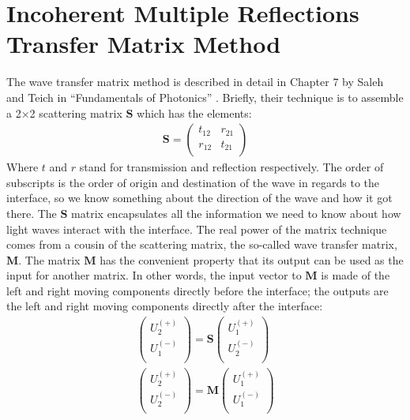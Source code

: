 \documentclass[osajnl,preprint,showpacs,superscriptaddress,12pt]{revtex4-1} %
\begin{document}
\appendix

\section{Incoherent Multiple Reflections Transfer Matrix Method}
\label{sec:Append-IMRTMM}

The wave transfer matrix method is described in detail in Chapter 7 by Saleh and Teich in ``Fundamentals of Photonics'' \cite{2007fuph.book.....S}.  Briefly, their technique is to assemble a 2$\times$2 scattering matrix $\boldsymbol{S}$ which has the elements:
\begin{eqnarray}
\boldsymbol{S} = \left(
\begin{array}{cc}
 t_{12} & r_{21} \\
 r_{12} & t_{21} \\
\end{array}
\right)
\end{eqnarray}
Where $t$ and $r$ stand for transmission and reflection respectively.  The order of subscripts is the order of origin and destination of the wave in regards to the interface, so we know something about the direction of the wave and how it got there.  The $\boldsymbol{S}$ matrix encapsulates all the information we need to know about how light waves interact with the interface.  The real power of the matrix technique comes from a cousin of the scattering matrix, the so-called wave transfer matrix, $\boldsymbol{M}$.  The matrix $\boldsymbol{M}$ has the convenient property that its output can be used as the input for another matrix.  In other words, the input vector to $\boldsymbol{M}$ is made of the left and right moving components directly before the interface; the outputs are the left and right moving components directly after the interface:
\begin{eqnarray}
\left(
\begin{array}{c}
 U_2^{(+)} \\
 U_1^{(-)} \\
\end{array}
\right)=\boldsymbol{S} \left(
\begin{array}{c}
 U_1^{(+)} \\
 U_2^{(-)} \\
\end{array}
\right) \\
\left(
\begin{array}{c}
 U_2^{(+)} \\
 U_2^{(-)} \\
\end{array}
\right)=\boldsymbol{M} \left(
\begin{array}{c}
 U_1^{(+)} \\
 U_1^{(-)} \\
\end{array}
\right)
\end{eqnarray}
\end{document}
